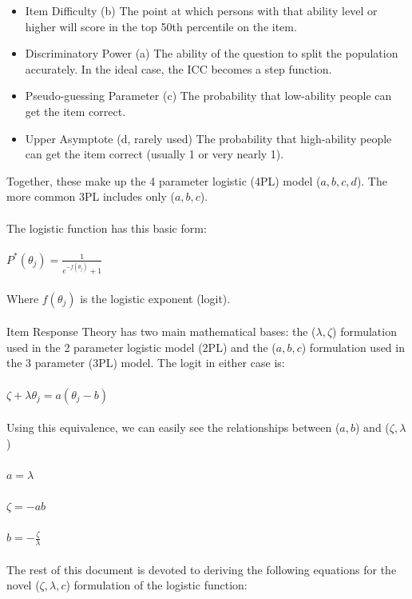\documentclass{article}
\begin{document}
\begin{itemize}
  \item Item Difficulty (b) The point at which persons with that ability level
        or higher will score in the top 50th percentile on the item.
  \item Discriminatory Power (a) The ability of the question to split the
        population accurately. In the ideal case, the ICC becomes a step function.
  \item Pseudo-guessing Parameter (c) The probability that low-ability people
        can get the item correct.
  \item Upper Asymptote (d, rarely used) The probability that high-ability people
        can get the item correct (usually 1 or very nearly 1).
\end{itemize}

Together, these make up the 4 parameter logistic (4PL) model ($a,b,c,d$).
The more common 3PL includes only ($a,b,c$).
\\\\
The logistic function has this basic form:
\\\\
$P^*(\theta _j) = \frac{1}{e^{-f(\theta _j)}+1}$
\\\\
Where $f(\theta _j)$ is the logistic exponent (logit).
\\\\
Item Response Theory has two main mathematical bases:
the ($\lambda,\zeta$) formulation used in the 2 parameter logistic model (2PL)
and the ($a,b,c$) formulation used in the 3 parameter (3PL) model.
The logit in either case is:
\\\\
$\zeta +\lambda \theta _j = a \left(\theta _j-b\right)$
\\\\
Using this equivalence, we can easily see the relationships between ($a,b$) and ($\zeta, \lambda$)
\\\\
$a = \lambda$
\\\\
$\zeta = -a b$
\\\\
$b = -\frac{\zeta }{\lambda }$
\\\\
The rest of this document is devoted to deriving the following equations
for the novel ($\zeta,\lambda,c$) formulation of the logistic function:
\end{document}
